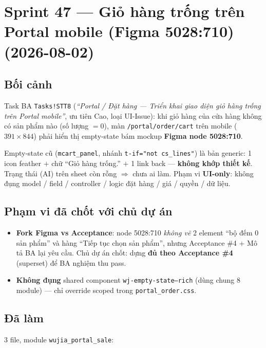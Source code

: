 \chapter{Sprint 47 --- Giỏ hàng trống trên Portal mobile (Figma 5028:710) (2026-08-02)}

\section{Bối cảnh}

Task BA \texttt{Tasks!STT8} (\emph{``Portal / Đặt hàng --- Triển khai giao diện giỏ hàng
trống trên Portal mobile''}, ưu tiên Cao, loại UI-Issue): khi giỏ hàng của cửa hàng không
có sản phẩm nào (số lượng $=0$), màn \texttt{/portal/order/cart} trên mobile
($391\times844$) phải hiển thị empty-state bám mockup \textbf{Figma node 5028:710}.

Empty-state cũ (\texttt{mcart\_panel}, nhánh \texttt{t-if="not cs\_lines"}) là bản generic:
1 icon feather $+$ chữ ``Giỏ hàng trống.'' $+$ 1 link back --- \textbf{không khớp thiết kế}.
Trạng thái (AI) trên sheet còn rỗng $\Rightarrow$ chưa ai làm. Phạm vi \textbf{UI-only}: không
đụng model / field / controller / logic đặt hàng / giá / quyền / dữ liệu.

\section{Phạm vi đã chốt với chủ dự án}

\begin{itemize}
  \item \textbf{Fork Figma vs Acceptance}: node 5028:710 \emph{không vẽ} 2 element ``bộ đếm 0
    sản phẩm'' và hàng ``Tiếp tục chọn sản phẩm'', nhưng Acceptance \#4 + Mô tả BA lại yêu
    cầu. Chủ dự án chốt: dựng \textbf{đủ theo Acceptance \#4} (superset) để BA nghiệm thu pass.
  \item \textbf{Không đụng} shared component \texttt{wj-empty-state--rich} (dùng chung 8
    module) --- chỉ override scoped trong \texttt{portal\_order.css}.
\end{itemize}

\section{Đã làm}

3 file, module \texttt{wujia\_portal\_sale}:


